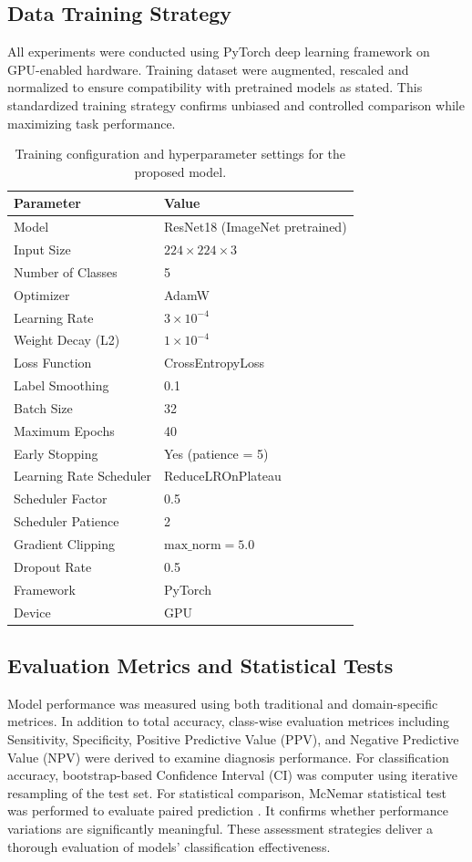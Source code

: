 \documentclass[conference,9pt]{IEEEtran}
\begin{document}
\subsection{\textbf{Data Training Strategy}}
All experiments were conducted using PyTorch deep learning framework on GPU-enabled hardware. Training dataset were augmented, rescaled and normalized to ensure compatibility with pretrained models as stated. This standardized training strategy confirms unbiased and controlled comparison while maximizing task performance.
\begin{table}[H]
\centering
\caption{Training configuration and hyperparameter settings for the proposed model.}
\label{tab:training_config}
\begin{tabular}{l l}
\toprule
\textbf{Parameter} & \textbf{Value} \\
\midrule
Model & ResNet18 (ImageNet pretrained) \\
Input Size & $224 \times 224 \times 3$ \\
Number of Classes & 5 \\
Optimizer & AdamW \\
Learning Rate & $3 \times 10^{-4}$ \\
Weight Decay (L2) & $1 \times 10^{-4}$ \\
Loss Function & CrossEntropyLoss \\
Label Smoothing & 0.1 \\
Batch Size & 32 \\
Maximum Epochs & 40 \\
Early Stopping & Yes (patience = 5) \\
Learning Rate Scheduler & ReduceLROnPlateau \\
Scheduler Factor & 0.5 \\
Scheduler Patience & 2 \\
Gradient Clipping & $\text{max\_norm} = 5.0$ \\
Dropout Rate & 0.5 \\
Framework & PyTorch \\
Device & GPU \\
\bottomrule
\end{tabular}
\end{table}


\subsection{\textbf{Evaluation Metrics and Statistical Tests} }
       Model performance was measured using both traditional and domain-specific metrices. In addition to total accuracy, class-wise evaluation metrices including Sensitivity, Specificity, Positive Predictive Value (PPV), and Negative Predictive Value (NPV) were derived to examine diagnosis performance. For classification accuracy, bootstrap-based Confidence Interval (CI) was computer using iterative resampling of the test set. For statistical comparison, McNemar statistical test was performed to evaluate paired prediction \cite{mcnemar}. It confirms whether performance variations are significantly meaningful. These assessment strategies deliver a thorough evaluation of models’ classification effectiveness.
\end{document}
